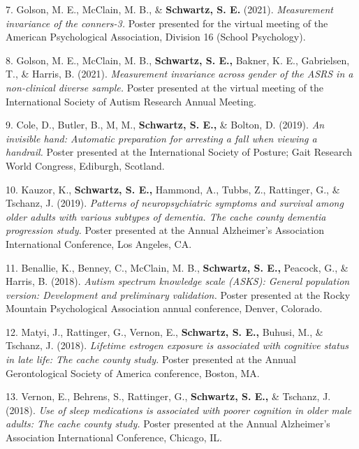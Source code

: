 \documentclass[11pt,a4paper,]{moderncv}
\newlength{\cslhangindent}
\newenvironment{CSLReferences}[2] %
 {\begin{list}{}{%
  \setlength{\itemindent}{0pt}
  \setlength{\leftmargin}{0pt}
  \setlength{\parsep}{0pt}
  \ifodd #1
   \setlength{\leftmargin}{\cslhangindent}
   \setlength{\itemindent}{-1\cslhangindent}
  \fi
  \setlength{\itemsep}{#2\baselineskip}}}
 {\end{list}}
\begin{document}
\begin{CSLReferences}{1}{0}
7. Golson, M. E., McClain, M. B., \& \textbf{Schwartz, S. E.} (2021).
\emph{Measurement invariance of the conners-3.} Poster presented for the
virtual meeting of the American Psychological Association, Division 16
(School Psychology).

8. Golson, M. E., McClain, M. B., \textbf{Schwartz, S. E.,} Bakner, K.
E., Gabrielsen, T., \& Harris, B. (2021). \emph{Measurement invariance
across gender of the ASRS in a non-clinical diverse sample.} Poster
presented at the virtual meeting of the International Society of Autism
Research Annual Meeting.

9. Cole, D., Butler, B., M, M., \textbf{Schwartz, S. E.,} \& Bolton, D.
(2019). \emph{An invisible hand: Automatic preparation for arresting a
fall when viewing a handrail.} Poster presented at the International
Society of Posture; Gait Research World Congress, Ediburgh, Scotland.

10. Kauzor, K., \textbf{Schwartz, S. E.,} Hammond, A., Tubbs, Z.,
Rattinger, G., \& Tschanz, J. (2019). \emph{Patterns of neuropsychiatric
symptoms and survival among older adults with various subtypes of
dementia. The cache county dementia progression study.} Poster presented
at the Annual Alzheimer's Association International Conference, Los
Angeles, CA.

11. Benallie, K., Benney, C., McClain, M. B., \textbf{Schwartz, S. E.,}
Peacock, G., \& Harris, B. (2018). \emph{Autism spectrum knowledge scale
(ASKS): General population version: Development and preliminary
validation.} Poster presented at the Rocky Mountain Psychological
Association annual conference, Denver, Colorado.

12. Matyi, J., Rattinger, G., Vernon, E., \textbf{Schwartz, S. E.,}
Buhusi, M., \& Tschanz, J. (2018). \emph{Lifetime estrogen exposure is
associated with cognitive status in late life: The cache county study.}
Poster presented at the Annual Gerontological Society of America
conference, Boston, MA.

13. Vernon, E., Behrens, S., Rattinger, G., \textbf{Schwartz, S. E.,} \&
Tschanz, J. (2018). \emph{Use of sleep medications is associated with
poorer cognition in older male adults: The cache county study.} Poster
presented at the Annual Alzheimer's Association International
Conference, Chicago, IL.


\end{CSLReferences}
\end{document}
